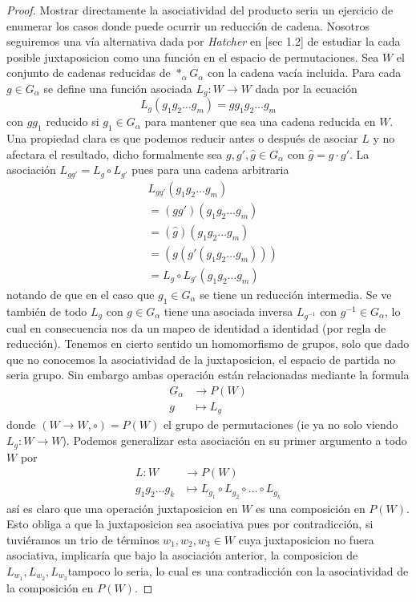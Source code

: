 \begin{proof}
  Mostrar directamente la asociatividad del producto seria un ejercicio
  de enumerar los casos donde puede ocurrir un reducción de cadena.
  Nosotros seguiremos una vía alternativa dada por \emph{Hatcher} en
  \cite{Hatcher}[sec 1.2] de estudiar la cada posible juxtaposicion como
  una función en el espacio de permutaciones. Sea \(W\) el conjunto de
  cadenas reducidas de \(*_\alpha G_\alpha\) con la cadena vacía
  incluida. Para cada \(g \in G_\alpha\) se define una función asociada
  \(L _g : W \to W\) dada por la ecuación
  \[ L_g \left( g_1 g_2 \dots g_m \right) = g g_1 g_2 \dots g_m \]
  con \(g g_1\) reducido si \(g_1 \in G_\alpha \) para mantener que sea
  una cadena reducida en \(W\). Una propiedad clara es que podemos
  reducir antes o después de asociar \(L\) y no afectara el resultado,
  dicho formalmente sea \(g, g', \hat g \in G_\alpha\) con \(\hat g = g
  \cdot g'\). La asociación \(L_{g g'} = L_{g} \circ L_{g'}\) pues para
  una cadena arbitraria
  \begin{align*}
    &L_{g g'} \left( g_1 g_2 \dots g_m \right) \\
    &= (g g') (g_1 g_2 \dots g_m) \\
    &= (\hat g) (g_1 g_2 \dots g_m) \\
    &= (g (g' (g_1 g_2 \dots g_m))) \\
    &= L_g \circ L_{g'} \left( g_1 g_2 \dots g_m \right)
  \end{align*}
  notando de que en el caso que \(g_1 \in G_\alpha\) se tiene un
  reducción intermedia. Se ve también de todo \(L_g\) con \(g \in
  G_\alpha\) tiene una asociada inversa \(L_{g^{-1}}\) con \(g^{-1} \in
  G_\alpha\), lo cual en consecuencia nos da un mapeo de identidad a
  identidad (por regla de reducción). Tenemos en cierto sentido un
  homomorfismo de grupos, solo que dado que no conocemos la
  asociatividad de la juxtaposicion, el espacio de partida no seria
  grupo. Sin embargo ambas operación están relacionadas mediante la
  formula
  \begin{align*}
    G_\alpha &\longrightarrow P(W) \\
    g &\longmapsto L_g
  \end{align*}
  donde \(\left( W \to W , \circ \right) = P(W)\) el grupo de
  permutaciones (ie ya no solo viendo \(L_g : W \to W\)). Podemos
  generalizar esta asociación en su primer argumento a todo \(W\) por
  \begin{align*}
    L : W &\longrightarrow P(W) \\
    g_1 g_2 \dots g_k &\longmapsto L_{g_1} \circ L_{g_2} \circ \dots
    \circ L_{g_k}
  \end{align*}
  así es claro que una operación juxtaposicion en \(W\) es una
  composición en \(P(W)\). Esto obliga a que la juxtaposicion sea
  asociativa pues por contradicción, si tuviéramos un trio de términos
  \(w_1, w_2, w_3 \in W\) cuya juxtaposicion no fuera asociativa, implicaría
  que bajo la asociación anterior, la composicion de \(L_{w_1}, L_{w_2},
  L_{w_3}\)tampoco lo seria, lo cual es una contradicción con la
  asociatividad de la composición en \(P(W)\).
\end{proof}

